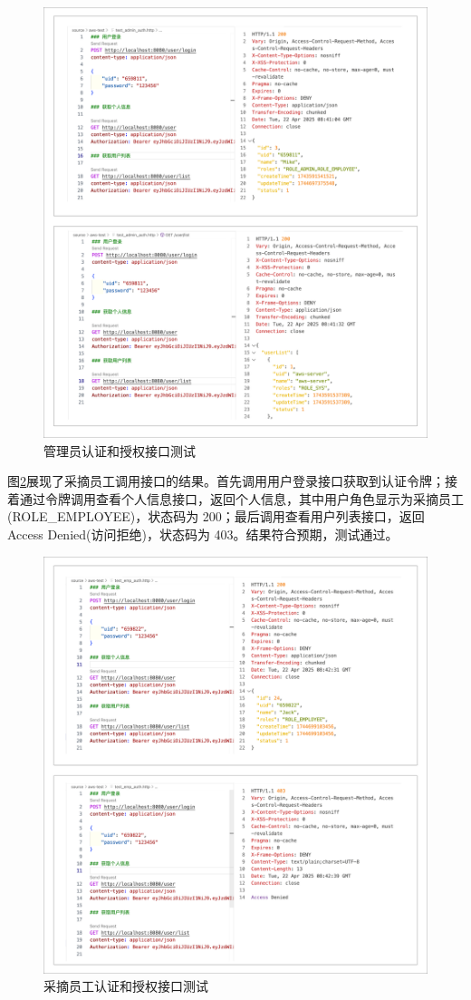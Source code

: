 \begin{figure}[H]
    \centering
    \includegraphics[width=0.9\linewidth]{../result/rest-user-auth-admin.png}
    \caption{管理员认证和授权接口测试}
    \label{fig:rest-user-auth-admin}
\end{figure}

图\ref{fig:rest-user-auth-emp}展现了采摘员工调用接口的结果。首先调用用户登录接口获取到认证令牌；接着通过令牌调用查看个人信息接口，返回个人信息，其中用户角色显示为采摘员工(ROLE\_EMPLOYEE)，状态码为 200；最后调用查看用户列表接口，返回 Access Denied(访问拒绝)，状态码为 403。结果符合预期，测试通过。

\begin{figure}[H]
    \centering
    \includegraphics[width=0.9\linewidth]{../result/rest-user-auth-emp.png}
    \caption{采摘员工认证和授权接口测试}
    \label{fig:rest-user-auth-emp}
\end{figure}

